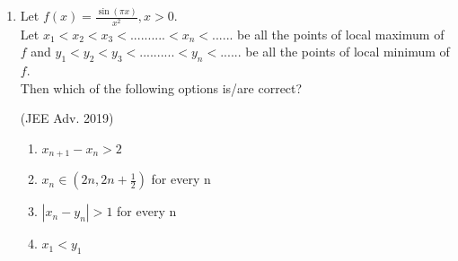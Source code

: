 \documentclass[journal,12pt,twocolumn]{IEEEtran}
\theoremstyle{remark}
\begin{document}
\begin{enumerate}[start = 7]
{        }
    \item{
        
            Let $f(x) = \displaystyle\frac{\sin(\pi x)}{x^2}, x>0$.\\[3pt]
            Let $x_1 < x_2 < x_3 < .......... <x_n <......$ be all the points of local maximum of $f$ and $y_1 < y_2 < y_3 < .......... <y_n <......$ be all the points of local minimum of $f$.\\
            Then which of the following options is/are correct?
            \begin{flushright}
                {(JEE Adv. 2019)}
            \end{flushright}
            \begin{enumerate}
                \item $x_{n+1} - x_{n} > 2$ 
                \item $x_{n} \in (2n, 2n+\frac{1}{2})$ for every n
                \item $|x_{n} - y_{n}|> 1 $ for every n
                \item $x_{1} < y_{1}$
            \end{enumerate}
        
        }
    \end{enumerate}
\end{document}
